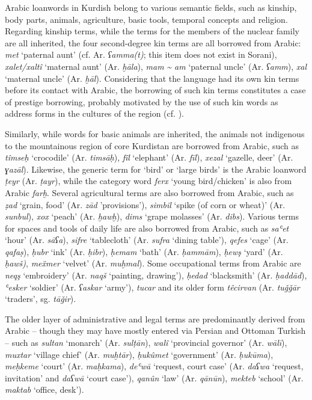 \documentclass[output=paper]{langsci/langscibook}
\begin{document}
Arabic loanwords in Kurdish belong to various semantic fields, such as kinship, body parts, animals, agriculture, basic tools, temporal concepts and religion. Regarding kinship terms, while the terms for the members of the nuclear family are all inherited, the four second-degree kin terms are all borrowed from Arabic: \textit{met} ‘paternal aunt’ (cf. Ar. \textit{ʕamma(t)}; this item does not exist in Sorani), \textit{xalet/xaltî} ‘maternal aunt’ (Ar. \textit{ḫāla}), \textit{mam} \textit{{\textasciitilde} am} ‘paternal uncle’ (Ar. \textit{ʕamm}), \textit{xal} ‘maternal uncle’ (Ar. \textit{ḫāl}). Considering that the language had its own kin terms before its contact with Arabic, the borrowing of such kin terms constitutes a case of prestige borrowing, probably motivated by the use of such kin words as address forms in the cultures of the region (cf. \citealt{HaigÖpengin2015}).

Similarly, while words for basic animals are inherited, the animals not indigenous to the mountainous region of core Kurdistan are borrowed from Arabic, such as \textit{tîmseḥ} ‘crocodile’ (Ar. \textit{timsāḥ}), \textit{fîl} ‘elephant’ (Ar. \textit{fīl}), \textit{xezal} ‘gazelle, deer’ (Ar. \textit{ɣazāl}). Likewise, the generic term for ‘bird’ or ‘large birds’ is the Arabic loanword \textit{ṭeyr} (Ar. \textit{ṭayr}), while the category word \textit{ferx} ‘young bird/chicken’ is also from Arabic \textit{farḫ}. Several agricultural terms are also borrowed from Arabic, such as \textit{ẓad} ‘grain, food’ (Ar. \textit{zād} 'provisions'), \textit{simbil} ‘spike (of corn or wheat)’ (Ar. \textit{sunbul}), \textit{xox} ‘peach’ (Ar. \textit{ḫawḫ}), \textit{dims} ‘grape molasses’ (Ar. \textit{dibs}). Various terms for spaces and tools of daily life are also borrowed from Arabic, such as \textit{saʿet} ‘hour’ (Ar. \textit{sāʕa}), \textit{sifre} ‘tablecloth’ (Ar. \textit{sufra} ‘dining table’), \textit{qefes} ‘cage’ (Ar. \textit{qafaṣ}), \textit{ḥubr} ‘ink’ (Ar. \textit{ḥibr}), \textit{ḥemam} ‘bath’ (Ar. \textit{ḥammām}), \textit{ḥewş} ‘yard’ (Ar. \textit{ḥawš)}, \textit{meẍmer} ‘velvet’ (Ar. \textit{muḫmal}). Some occupational terms from Arabic are \textit{neqş} ‘embroidery’ (Ar. \textit{naqš} ‘painting, drawing’), \textit{ḥedad} ‘blacksmith’ (Ar. \textit{ḥaddād}), \textit{ʿesker} ‘soldier’ (Ar. \textit{ʕaskar} ‘army’), \textit{tucar} and its older form \textit{têcirvan} (Ar. \textit{tuǧǧār} ‘traders’, sg. \textit{tāǧir}).  

The older layer of administrative and legal terms are predominantly derived from Arabic – though they may have mostly entered via Persian and Ottoman Turkish – such as \textit{sultan} ‘monarch’ (Ar. \textit{sulṭān}), \textit{walî} ‘provincial governor’ (Ar. \textit{wālī}), \textit{muxtar} ‘village chief’ (Ar. \textit{muḫtār}), \textit{ḥukûmet} ‘government’ (Ar. \textit{ḥukūma}), \textit{meḥkeme} ‘court’ (Ar. \textit{maḥkama}), \textit{deʿwā} ‘request, court case’ (Ar. \textit{daʕwa} ‘request, invitation’ and \textit{daʕwā} ‘court case’), \textit{qanûn} ‘law’ (Ar. \textit{qānūn}), \textit{mekteb} ‘school’ (Ar. \textit{maktab} ‘office, desk’).  
\end{document}
